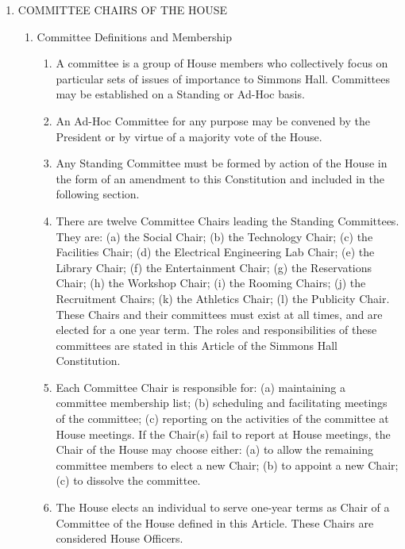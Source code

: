 \documentclass[letterpaper]{article}
\begin{document}
\begin{enumerate}
\item COMMITTEE CHAIRS OF THE HOUSE 

\begin{enumerate}

\item Committee Definitions and Membership 

\begin{enumerate}

\item A committee is a group of House members who collectively focus on particular sets of issues of importance to Simmons Hall. Committees may be established on a Standing or Ad-Hoc basis.

\item An Ad-Hoc Committee for any purpose may be convened by the President or by virtue of a majority vote of the House.

\item Any Standing Committee must be formed by action of the House in the form of an amendment to this Constitution and included in the following section.

\item There are twelve Committee Chairs leading the Standing Committees. They are: (a) the Social Chair; (b) the Technology Chair; (c) the Facilities Chair; (d) the Electrical Engineering Lab Chair; (e) the Library Chair; (f) the Entertainment Chair; (g) the Reservations Chair; (h) the Workshop Chair; (i) the Rooming Chairs; (j) the Recruitment Chairs; (k) the Athletics Chair; (l) the Publicity Chair. These Chairs and their committees must exist at all times, and are elected for a one year term. The roles and responsibilities of these committees are stated in this Article of the Simmons Hall Constitution.

\item Each Committee Chair is responsible for: (a) maintaining a committee membership list; (b) scheduling and facilitating meetings of the committee; (c) reporting on the activities of the committee at House meetings. If the Chair(s) fail to report at House meetings, the Chair of the House may choose either: (a) to allow the remaining committee members to elect a new Chair; (b) to appoint a new Chair; (c) to dissolve the committee.

\item The House elects an individual to serve one-year terms as Chair of a Committee of the House defined in this Article. These Chairs are considered House Officers.


\end{enumerate}
\end{enumerate}
\end{enumerate}
\end{document}
